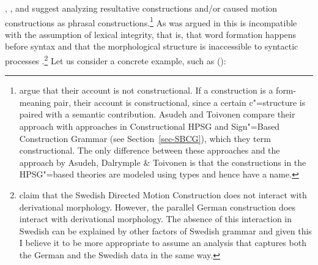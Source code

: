 \citet{GJ2004a}, \citet{Alsina96a}, and \citet*{ADT2008a,ADT2013a} suggest analyzing resultative
constructions and/or caused motion constructions as phrasal constructions.\footnote{%
\citet[Section~2.3]{AT2014a} argue that their account is not constructional. If a construction is a
form-meaning pair, their account is constructional, since a certain c"=structure is paired with a
semantic contribution. Asudeh and Toivonen compare their approach with approaches in Constructional
HPSG \citep{Sag97a} and Sign"=Based Construction Grammar (see Section~\ref{sec-SBCG}), which they term constructional. The only difference
between these approaches and the approach by Asudeh, Dalrymple \& Toivonen is that the constructions in the HPSG"=based theories are modeled using types and
hence have a name.%
} As was argued in
 this is incompatible with the assumption of lexical integrity, that is, that
word formation happens before syntax  and that the morphological structure is inaccessible to
syntactic processes \citep{BM95a}.\footnote{
  \citet[]{ADT2013a} claim that the Swedish Directed Motion Construction does not interact
  with derivational morphology. However, the parallel German construction does interact with
  derivational morphology. The absence of this interaction in Swedish can be explained by other
  factors of Swedish grammar and given this I believe it to be more appropriate to assume an
  analysis that captures both the German and the Swedish data in the same way.%
}
Let us consider a concrete example, such as ():
\eal
\label{ex-tanzt-schuhe-blutig}
